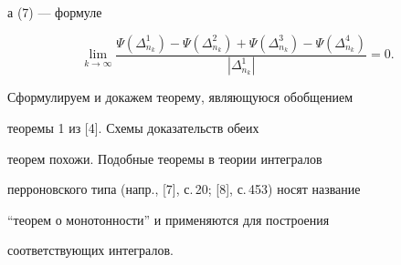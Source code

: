 а (7) --- формуле


\begin{equation}


\lim\limits_{k \to \infty}\displaystyle\frac


{\Psi(\Delta_{n_k}^{1})-\Psi(\Delta_{n_k}^{2})


+\Psi(\Delta_{n_k}^{3})-\Psi(\Delta_{n_k}^{4})}


{|\Delta_{n_k}^{1}|}=0. 


\end{equation}





Сформулируем и докажем теорему, являющуюся обобщением


теоремы 1 из [4]. Схемы доказательств обеих


теорем похожи. Подобные теоремы в теории интегралов 


перроновского типа (напр., [7], с.\,20; [8], с.\,453) носят название 


``теорем о монотонности'' и применяются для построения 


соответствующих интегралов. 





